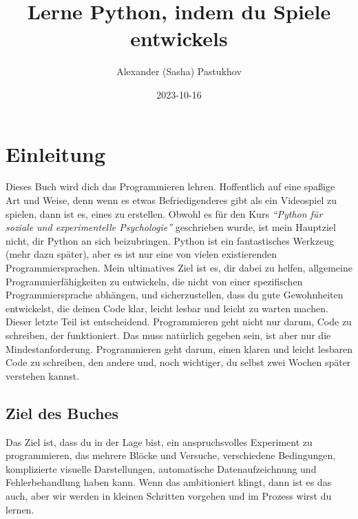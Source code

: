 \documentclass[
]{book}
\title{Lerne Python, indem du Spiele entwickels}
\author{Alexander (Sasha) Pastukhov}
\date{2023-10-16}
\begin{document}
\maketitle

{
\setcounter{tocdepth}{1}
\tableofcontents
}
\hypertarget{intro}{%
\chapter{Einleitung}\label{intro}}

Dieses Buch wird dich das Programmieren lehren. Hoffentlich auf eine spaßige Art und Weise, denn wenn es etwas Befriedigenderes gibt als ein Videospiel zu spielen, dann ist es, eines zu erstellen. Obwohl es für den Kurs \emph{``Python für soziale und experimentelle Psychologie''} geschrieben wurde, ist mein Hauptziel nicht, dir Python an sich beizubringen. Python ist ein fantastisches Werkzeug (mehr dazu später), aber es ist nur eine von vielen existierenden Programmiersprachen. Mein ultimatives Ziel ist es, dir dabei zu helfen, allgemeine Programmierfähigkeiten zu entwickeln, die nicht von einer spezifischen Programmiersprache abhängen, und sicherzustellen, dass du gute Gewohnheiten entwickelst, die deinen Code klar, leicht lesbar und leicht zu warten machen. Dieser letzte Teil ist entscheidend. Programmieren geht nicht nur darum, Code zu schreiben, der funktioniert. Das muss natürlich gegeben sein, ist aber nur die Mindestanforderung. Programmieren geht darum, einen klaren und leicht lesbaren Code zu schreiben, den andere und, noch wichtiger, du selbst zwei Wochen später verstehen kannst.

\hypertarget{ziel-des-buches}{%
\section{Ziel des Buches}\label{ziel-des-buches}}

Das Ziel ist, dass du in der Lage bist, ein anspruchsvolles Experiment zu programmieren, das mehrere Blöcke und Versuche, verschiedene Bedingungen, komplizierte visuelle Darstellungen, automatische Datenaufzeichnung und Fehlerbehandlung haben kann. Wenn das ambitioniert klingt, dann ist es das auch, aber wir werden in kleinen Schritten vorgehen und im Prozess wirst du lernen.
\end{document}
